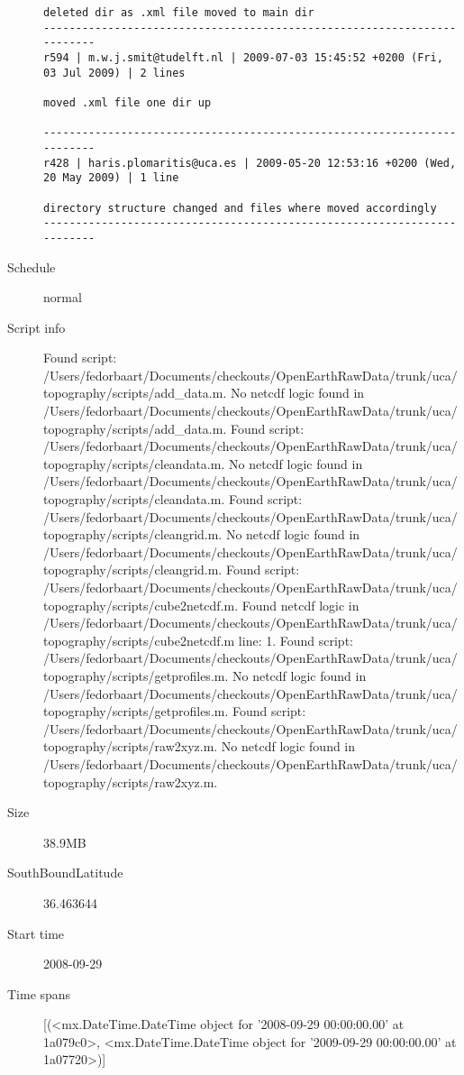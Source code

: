\documentclass[9]{report}
\begin{document}
\begin{description}
\begin{verbatim}
deleted dir as .xml file moved to main dir
------------------------------------------------------------------------
r594 | m.w.j.smit@tudelft.nl | 2009-07-03 15:45:52 +0200 (Fri, 03 Jul 2009) | 2 lines

moved .xml file one dir up

------------------------------------------------------------------------
r428 | haris.plomaritis@uca.es | 2009-05-20 12:53:16 +0200 (Wed, 20 May 2009) | 1 line

directory structure changed and files where moved accordingly 
------------------------------------------------------------------------

\end{verbatim}
  \item[Schedule] normal
  \item[Script info] Found script: /Users/fedorbaart/Documents/checkouts/OpenEarthRawData/trunk/uca/topography/scripts/add\_data.m.
No netcdf logic found in /Users/fedorbaart/Documents/checkouts/OpenEarthRawData/trunk/uca/topography/scripts/add\_data.m.
Found script: /Users/fedorbaart/Documents/checkouts/OpenEarthRawData/trunk/uca/topography/scripts/cleandata.m.
No netcdf logic found in /Users/fedorbaart/Documents/checkouts/OpenEarthRawData/trunk/uca/topography/scripts/cleandata.m.
Found script: /Users/fedorbaart/Documents/checkouts/OpenEarthRawData/trunk/uca/topography/scripts/cleangrid.m.
No netcdf logic found in /Users/fedorbaart/Documents/checkouts/OpenEarthRawData/trunk/uca/topography/scripts/cleangrid.m.
Found script: /Users/fedorbaart/Documents/checkouts/OpenEarthRawData/trunk/uca/topography/scripts/cube2netcdf.m.
Found netcdf logic in /Users/fedorbaart/Documents/checkouts/OpenEarthRawData/trunk/uca/topography/scripts/cube2netcdf.m line: 1.
Found script: /Users/fedorbaart/Documents/checkouts/OpenEarthRawData/trunk/uca/topography/scripts/getprofiles.m.
No netcdf logic found in /Users/fedorbaart/Documents/checkouts/OpenEarthRawData/trunk/uca/topography/scripts/getprofiles.m.
Found script: /Users/fedorbaart/Documents/checkouts/OpenEarthRawData/trunk/uca/topography/scripts/raw2xyz.m.
No netcdf logic found in /Users/fedorbaart/Documents/checkouts/OpenEarthRawData/trunk/uca/topography/scripts/raw2xyz.m.
  \item[Size] 38.9MB
  \item[SouthBoundLatitude] 36.463644
  \item[Start time] 2008-09-29
  \item[Time spans] [(<mx.DateTime.DateTime object for '2008-09-29 00:00:00.00' at 1a079c0>, <mx.DateTime.DateTime object for '2009-09-29 00:00:00.00' at 1a07720>)]

\end{description}
\end{document}
